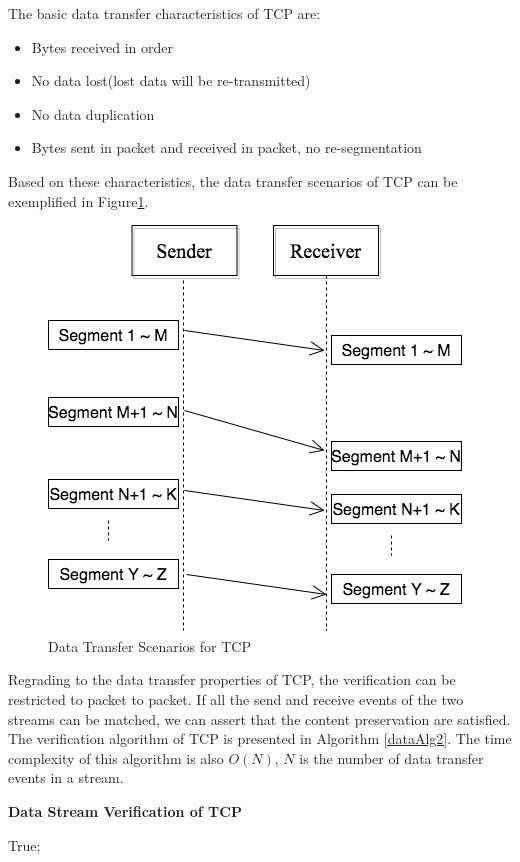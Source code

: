 The basic data transfer characteristics of TCP are:
\begin{itemize}
  \item Bytes received in order
  \item No data lost(lost data will be re-transmitted)
  \item No data duplication
  \item Bytes sent in packet and received in packet, no re-segmentation
\end{itemize}

Based on these characteristics,  the data transfer scenarios of TCP can be exemplified in Figure\ref{tcp}.
\begin{figure}[H]
\centerline{\includegraphics[scale=0.4]{Figures/tcp}}
 \caption{Data Transfer Scenarios for TCP}
\label{tcp}
\end{figure}

Regrading to the data transfer properties of TCP, the verification can be restricted to packet to packet. If all the send and receive events of the two streams can be matched, we can assert that the content preservation are satisfied. The verification algorithm of TCP is presented in Algorithm \ref{dataAlg2}. The time complexity of this algorithm is also $O(N)$, $N$ is the number of data transfer events in a stream.

\begin{algorithm}[H]
\DontPrintSemicolon
\caption{{\bf Data Stream Verification of TCP} \label{dataAlg2}}
\;
 \KwRet True;\;
\end{algorithm} 



